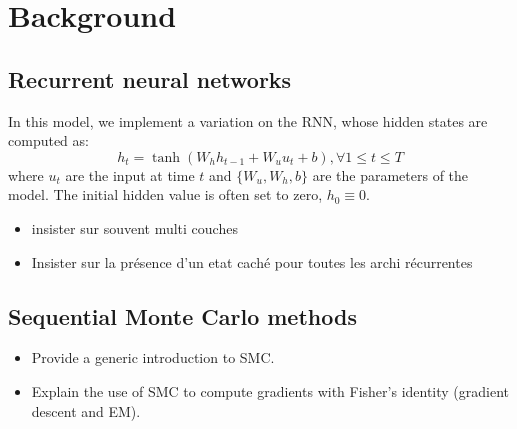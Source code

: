 \documentclass{article}
\begin{document}
\section{Background}
\label{sec:background}

\subsection{Recurrent neural networks}
\label{sec:background:rnn}
In this model, we implement a variation on the RNN, whose hidden states are computed as:
$$
	h_t = \tanh(W_h h_{t-1} + W_u u_t + b), \forall 1 \leq t \leq T
$$
where $u_t$ are the input at time $t$ and $\{W_u, W_h, b\}$ are the parameters of the model. The initial hidden value is often set to zero, $h_0 \equiv 0$.

\begin{itemize}
	\item insister sur souvent multi couches
	\item Insister sur la présence d'un etat caché pour toutes les archi récurrentes
\end{itemize}



\subsection{Sequential Monte Carlo methods}
\label{sec:background:smc}
\begin{itemize}
	\item Provide a generic introduction to SMC.
	\item Explain the use of SMC to compute gradients with Fisher's identity (gradient descent and EM).
\end{itemize}
\end{document}
